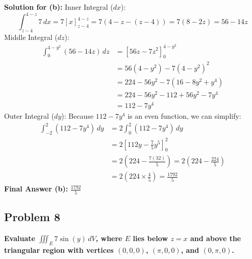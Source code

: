 \documentclass[12pt]{article}
\begin{document}
\textbf{Solution for (b):}
Inner Integral ($dx$):
\[ \int_{z-4}^{4-z} 7 \, dx = 7[x]_{z-4}^{4-z} = 7(4-z - (z-4)) = 7(8-2z) = 56 - 14z \]
Middle Integral ($dz$):
\begin{align*} 
\int_{0}^{4-y^2} (56 - 14z) \, dz &= \left[ 56z - 7z^2 \right]_{0}^{4-y^2} \\
&= 56(4-y^2) - 7(4-y^2)^2 \\
&= 224 - 56y^2 - 7(16 - 8y^2 + y^4) \\
&= 224 - 56y^2 - 112 + 56y^2 - 7y^4 \\
&= 112 - 7y^4
\end{align*}
Outer Integral ($dy$):
Because $112 - 7y^4$ is an even function, we can simplify:
\begin{align*} 
\int_{-2}^{2} (112 - 7y^4) \, dy &= 2 \int_{0}^{2} (112 - 7y^4) \, dy \\
&= 2 \left[ 112y - \frac{7}{5}y^5 \right]_{0}^{2} \\
&= 2 \left( 224 - \frac{7(32)}{5} \right) = 2 \left( 224 - \frac{224}{5} \right) \\
&= 2 \left( 224 \times \frac{4}{5} \right) = \frac{1792}{5}
\end{align*}
\textbf{Final Answer (b):} $\frac{1792}{5}$

\vspace{0.5cm}
\subsection*{Problem 8}
\textbf{Evaluate $\iiint_E 7 \sin(y) \, dV$, where $E$ lies below $z = x$ and above the triangular region with vertices $(0,0,0)$, $(\pi,0,0)$, and $(0,\pi,0)$.}
\end{document}
